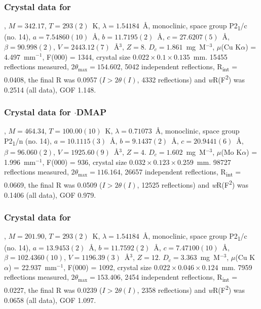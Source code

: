 \begin{refsection}
\subsubsection{Crystal data for \texorpdfstring{}{C14 H8 F3 N O Se}}
, $M=342.17$, $T=293(2)$~K, $\lambda=1.54184$~\AA, monoclinic, space group P2\textsubscript{1}/c (no. 14), $a = 7.54860(10)$~\AA, $b = 11.7195(2)$~\AA, $c = 27.6207(5)$~\AA, $\beta = 90.998(2)$\degree, $V = 2443.12(7)$~\AA$^{3}$, $Z = 8$. $D_{c}= 1.861$~mg~M$^{-3}$, $\mu$(Cu K$\alpha$) = 4.497~mm$^{-1}$, F(000) = 1344, crystal size $0.022 \times 0.1 \times 0.135$~mm. 15455 reflections measured, $2\theta_{\mathrm{max}}=154.602$\degree, 5042 independent reflections, R\textsubscript{int} = 0.0408, the final R was 0.0957 ($I > 2\theta(I)$, 4332 reflections) and \emph{w}R(F\textsuperscript{2}) was 0.2514 (all data), GOF 1.148.

\subsubsection{Crystal data for \texorpdfstring{$\cdot$DMAP}{C21 H18 F3 N3 O Se}}
, $M=464.34$, $T=100.00(10)$~K, $\lambda=0.71073$~\AA, monoclinic, space group P2\textsubscript{1}/n (no. 14), $a = 10.1115(3)$~\AA, $b = 9.1437(2)$~\AA, $c = 20.9441(6)$~\AA, $\beta = 96.060(2)$\degree, $V = 1925.60(9)$~\AA$^{3}$, $Z = 4$. $D_{c}= 1.602$~mg~M$^{-3}$, $\mu$(Mo K$\alpha$) = 1.996~mm$^{-1}$, F(000) = 936, crystal size $0.032 \times 0.123 \times 0.259$~mm. 98727 reflections measured, $2\theta_{\mathrm{max}}=116.164$\degree, 26657 independent reflections, R\textsubscript{int} = 0.0669, the final R was 0.0509 ($I > 2\theta(I)$, 12525 reflections) and \emph{w}R(F\textsuperscript{2}) was 0.1406 (all data), GOF 0.979.

\subsubsection{Crystal data for \texorpdfstring{}{C H Br N O Se}}
, $M=201.90$, $T=293(2)$~K, $\lambda=1.54184$~\AA, monoclinic, space group P2\textsubscript{1}/c (no. 14), $a = 13.9453(2)$~\AA, $b = 11.7592(2)$~\AA, $c = 7.47100(10)$~\AA, $\beta = 102.4360(10)$\degree, $V = 1196.39(3)$~\AA$^{3}$, $Z = 12$. $D_{c}= 3.363$~mg~M$^{-3}$, $\mu$(Cu K$\alpha$) = 22.937~mm$^{-1}$, F(000) = 1092, crystal size $0.022 \times 0.046 \times 0.124$~mm. 7959 reflections measured, $2\theta_{\mathrm{max}}=153.406$\degree, 2454 independent reflections, R\textsubscript{int} = 0.0227, the final R was 0.0239 ($I > 2\theta(I)$, 2358 reflections) and \emph{w}R(F\textsuperscript{2}) was 0.0658 (all data), GOF 1.097.


\end{refsection}
